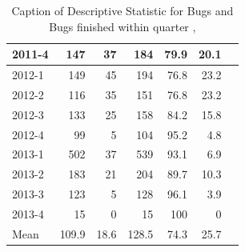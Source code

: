 \documentclass[UKenglish]{ifimaster}  %
\begin{document}
\begin{appendices}
\begin{table}[!htbp]
\begin{adjustwidth}{-2.5cm}{}
{{\begin{tabular}{ | l | r | r | r | r | r | r | }
2011-4 & 147 & 37 & 184 & 79.9 & 20.1 \\ \hline
2012-1 & 149 & 45 & 194 & 76.8 & 23.2 \\ \hline
2012-2 & 116 & 35 & 151 & 76.8 & 23.2 \\ \hline
2012-3 & 133 & 25 & 158 & 84.2 & 15.8 \\ \hline
2012-4 & 99 & 5 & 104 & 95.2 & 4.8 \\ \hline
2013-1 & 502 & 37 & 539 & 93.1 & 6.9 \\ \hline
2013-2 & 183 & 21 & 204 & 89.7 & 10.3 \\ \hline
2013-3 & 123 & 5 & 128 & 96.1 & 3.9 \\ \hline
2013-4 & 15 & 0 & 15 & 100 & 0 \\ \hline
Mean & 109.9&	18.6&128.5&74.3&25.7 \\ \hline

\end{tabular}
}
}
\end{adjustwidth}
\caption[Optional caption for list of figures]{Caption of Descriptive Statistic for Bugs and Bugs finished within quarter  , }
\label{DS:2:5} %
\end{table}



\end{appendices}
\end{document}
